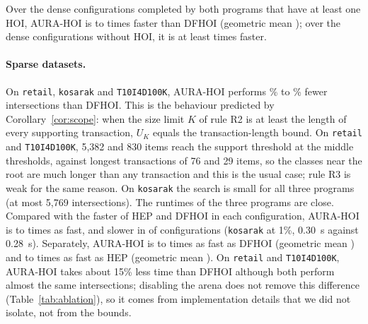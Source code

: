 \documentclass[pdflatex,sn-mathphys,Numbered]{sn-jnl}
\theoremstyle{thmstyleone}
\theoremstyle{thmstyletwo}
\theoremstyle{thmstylethree}
\newcommand{\Ucap}{U}
\newcommand{\AURA}{AURA-HOI}
\begin{document}
Over the \NumSpeedupDenseNonEmpty{} dense configurations completed by both programs that have at least one HOI, \AURA{} is \MinSpeedupDenseNonEmpty{} to \MaxSpeedupDenseNonEmpty{} times faster than DFHOI (geometric mean \GeoSpeedupDenseNonEmpty{}); over the \NumSpeedupDenseEmpty{} dense configurations without HOI, it is at least \MinSpeedupDenseEmpty{} times faster.

\paragraph{Sparse datasets.}
On \texttt{retail}, \texttt{kosarak} and \texttt{T10I4D100K}, \AURA{} performs \NodeReductionMinSparse{}\% to \NodeReductionMaxSparse{}\% fewer intersections than DFHOI. This is the behaviour predicted by Corollary~\ref{cor:scope}: when the size limit $K$ of rule R2 is at least the length of every supporting transaction, $\Ucap_K$ equals the transaction-length bound. On \texttt{retail} and \texttt{T10I4D100K}, 5,382 and 830 items reach the support threshold at the middle thresholds, against longest transactions of 76 and 29 items, so the classes near the root are much longer than any transaction and this is the usual case; rule R3 is weak for the same reason. On \texttt{kosarak} the search is small for all three programs (at most 5,769 intersections). The runtimes of the three programs are close. Compared with the faster of HEP and DFHOI in each configuration, \AURA{} is \SparseVsBestMin{} to \SparseVsBestMax{} times as fast, and slower in \SparseSlowerThanBest{} of \SparseVsBestN{} configurations (\texttt{kosarak} at 1\%, 0.30~s against 0.28~s). Separately, \AURA{} is \MinSpeedupSparse{} to \MaxSpeedupSparse{} times as fast as DFHOI (geometric mean \GeoSpeedupSparse{}) and \MinSpeedupSparseHEP{} to \MaxSpeedupSparseHEP{} times as fast as HEP (geometric mean \GeoSpeedupSparseHEP{}). On \texttt{retail} and \texttt{T10I4D100K}, \AURA{} takes about 15\% less time than DFHOI although both perform almost the same intersections; disabling the arena does not remove this difference (Table~\ref{tab:ablation}), so it comes from implementation details that we did not isolate, not from the bounds.
\end{document}
